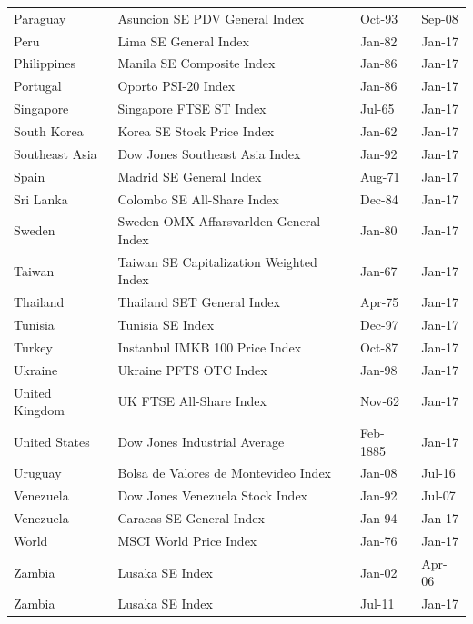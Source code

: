 \documentclass[12pt,final,fleqn]{article}
\theoremstyle{plain}
\begin{document}
\begin{table}[!ht]
\begin{center}
\begin{threeparttable}
\begin{tabular*}{\textwidth}{l@{\extracolsep{\fill}}lll}
Paraguay & Asuncion SE PDV General Index & Oct-93 & Sep-08\\
Peru & Lima SE General Index & Jan-82 & Jan-17\\
Philippines & Manila SE Composite Index & Jan-86 & Jan-17\\
Portugal & Oporto PSI-20 Index & Jan-86 & Jan-17\\
Singapore & Singapore FTSE ST Index & Jul-65 & Jan-17\\
South Korea & Korea SE Stock Price Index  & Jan-62 & Jan-17\\
Southeast Asia & Dow Jones Southeast Asia Index & Jan-92 & Jan-17\\
Spain & Madrid SE General Index & Aug-71 & Jan-17\\
Sri Lanka & Colombo SE All-Share Index & Dec-84 & Jan-17\\
Sweden & Sweden OMX Affarsvarlden General Index & Jan-80 & Jan-17\\
Taiwan & Taiwan SE Capitalization Weighted Index & Jan-67 & Jan-17\\
Thailand & Thailand SET General Index & Apr-75 & Jan-17\\
Tunisia & Tunisia SE Index & Dec-97 & Jan-17\\
Turkey & Instanbul IMKB 100 Price Index & Oct-87 & Jan-17\\
Ukraine & Ukraine PFTS OTC Index & Jan-98 & Jan-17\\
United Kingdom & UK FTSE All-Share Index & Nov-62 & Jan-17\\
United States & Dow Jones Industrial Average & Feb-1885 & Jan-17\\
Uruguay & Bolsa de Valores de Montevideo Index & Jan-08 & Jul-16\\
Venezuela & Dow Jones Venezuela Stock Index & Jan-92 & Jul-07\\
Venezuela & Caracas SE General Index & Jan-94 & Jan-17\\
World & MSCI World Price Index & Jan-76 & Jan-17\\
Zambia & Lusaka SE Index & Jan-02 & Apr-06\\
Zambia & Lusaka SE Index & Jul-11 & Jan-17\\
   \hline
   \hline
\end{tabular*}
\end{threeparttable}
\end{center}
\end{table}
\end{document}
